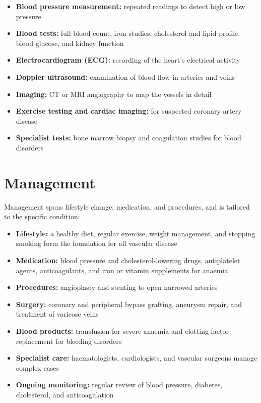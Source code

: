 \begin{itemize}
    \item \textbf{Blood pressure measurement:} repeated readings to detect high or low pressure
    \item \textbf{Blood tests:} full blood count, iron studies, cholesterol and lipid profile, blood glucose, and kidney function
    \item \textbf{Electrocardiogram (ECG):} recording of the heart's electrical activity
    \item \textbf{Doppler ultrasound:} examination of blood flow in arteries and veins
    \item \textbf{Imaging:} CT or MRI angiography to map the vessels in detail
    \item \textbf{Exercise testing and cardiac imaging:} for suspected coronary artery disease
    \item \textbf{Specialist tests:} bone marrow biopsy and coagulation studies for blood disorders
\end{itemize}

\section*{Management}
Management spans lifestyle change, medication, and procedures, and is tailored to the specific condition:

\begin{itemize}
    \item \textbf{Lifestyle:} a healthy diet, regular exercise, weight management, and stopping smoking form the foundation for all vascular disease
    \item \textbf{Medication:} blood pressure and cholesterol-lowering drugs, antiplatelet agents, anticoagulants, and iron or vitamin supplements for anaemia
    \item \textbf{Procedures:} angioplasty and stenting to open narrowed arteries
    \item \textbf{Surgery:} coronary and peripheral bypass grafting, aneurysm repair, and treatment of varicose veins
    \item \textbf{Blood products:} transfusion for severe anaemia and clotting-factor replacement for bleeding disorders
    \item \textbf{Specialist care:} haematologists, cardiologists, and vascular surgeons manage complex cases
    \item \textbf{Ongoing monitoring:} regular review of blood pressure, diabetes, cholesterol, and anticoagulation
\end{itemize}

